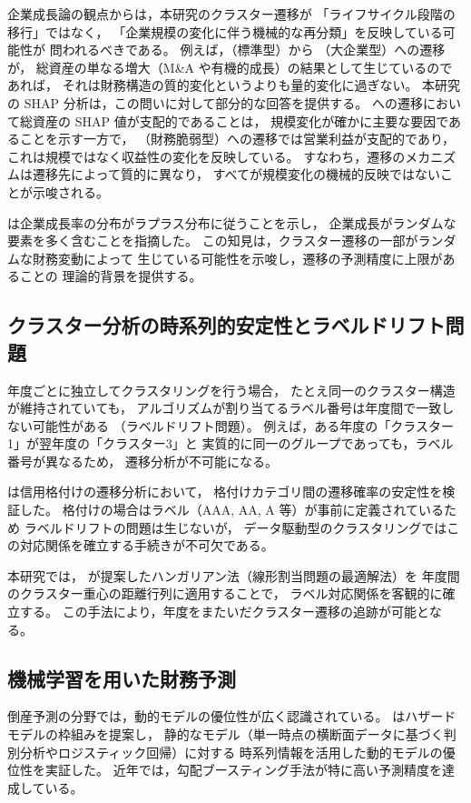 企業成長論の観点からは，本研究のクラスター遷移が
「ライフサイクル段階の移行」ではなく，
「企業規模の変化に伴う機械的な再分類」を反映している可能性が
問われるべきである。
例えば，（標準型）から （大企業型）への遷移が，
総資産の単なる増大（M\&A や有機的成長）の結果として生じているのであれば，
それは財務構造の質的変化というよりも量的変化に過ぎない。
本研究の SHAP 分析は，この問いに対して部分的な回答を提供する。
 への遷移において総資産の SHAP 値が支配的であることは，
規模変化が確かに主要な要因であることを示す一方で，
（財務脆弱型）への遷移では営業利益が支配的であり，
これは規模ではなく収益性の変化を反映している。
すなわち，遷移のメカニズムは遷移先によって質的に異なり，
すべてが規模変化の機械的反映ではないことが示唆される。

 は企業成長率の分布がラプラス分布に従うことを示し，
企業成長がランダムな要素を多く含むことを指摘した。
この知見は，クラスター遷移の一部がランダムな財務変動によって
生じている可能性を示唆し，遷移の予測精度に上限があることの
理論的背景を提供する。

\subsection{クラスター分析の時系列的安定性とラベルドリフト問題}

年度ごとに独立してクラスタリングを行う場合，
たとえ同一のクラスター構造が維持されていても，
アルゴリズムが割り当てるラベル番号は年度間で一致しない可能性がある
（ラベルドリフト問題）。
例えば，ある年度の「クラスター1」が翌年度の「クラスター3」と
実質的に同一のグループであっても，ラベル番号が異なるため，
遷移分析が不可能になる。

 は信用格付けの遷移分析において，
格付けカテゴリ間の遷移確率の安定性を検証した。
格付けの場合はラベル（AAA, AA, A 等）が事前に定義されているため
ラベルドリフトの問題は生じないが，
データ駆動型のクラスタリングではこの対応関係を確立する手続きが不可欠である。

本研究では， が提案したハンガリアン法（線形割当問題の最適解法）を
年度間のクラスター重心の距離行列に適用することで，
ラベル対応関係を客観的に確立する。
この手法により，年度をまたいだクラスター遷移の追跡が可能となる。

\subsection{機械学習を用いた財務予測}

倒産予測の分野では，動的モデルの優位性が広く認識されている。
 はハザードモデルの枠組みを提案し，
静的なモデル（単一時点の横断面データに基づく判別分析やロジスティック回帰）に対する
時系列情報を活用した動的モデルの優位性を実証した。
近年では，勾配ブースティング手法が特に高い予測精度を達成している。

